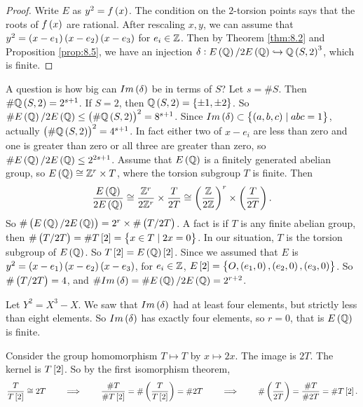 \begin{proof}
Write $ E $ as $ y^2 = f\br{x} $. The condition on the $ 2 $-torsion points says that the roots of $ f\br{x} $ are rational. After rescaling $ x, y $, we can assume that $ y^2 = \br{x - e_1}\br{x - e_2}\br{x - e_3} $ for $ e_i \in \mathbb{Z} $. Then by Theorem \ref{thm:8.2} and Proposition \ref{prop:8.5}, we have an injection $ \delta : E\br{\Q} / 2E\br{\Q} \hookrightarrow \Q\br{S, 2}^3 $, which is finite.
\end{proof}

A question is how big can $ Im\br{\delta} $ be in terms of $ S $? Let $ s = \#S $. Then $ \#\Q\br{S, 2} = 2^{s + 1} $. If $ S = 2 $, then $ \Q\br{S, 2} = \cbr{\pm 1, \pm 2} $. So $ \#E\br{\Q} / 2E\br{\Q} \le \br{\#\Q\br{S, 2}}^2 = 8^{s + 1} $. Since $ Im\br{\delta} \subset \cbr{\br{a, b, c} \mid abc = 1} $, actually $ \br{\#\Q\br{S, 2}}^2 = 4^{s + 1} $. In fact either two of $ x - e_i $ are less than zero and one is greater than zero or all three are greater than zero, so $ \#E\br{\Q} / 2E\br{\Q} \le 2^{2s + 1} $. Assume that $ E\br{\Q} $ is a finitely generated abelian group, so $ E\br{\Q} \cong \Z^r \times T $, where the torsion subgroup $ T $ is finite. Then
$$ \dfrac{E\br{\Q}}{2E\br{\Q}} \cong \dfrac{\Z^r}{2\Z^r} \times \dfrac{T}{2T} \cong \br{\dfrac{\Z}{2\Z}}^r \times \br{\dfrac{T}{2T}}. $$
So $ \#\br{E\br{\Q} / 2E\br{\Q}} = 2^r \times \#\br{T / 2T} $. A fact is if $ T $ is any finite abelian group, then $ \#\br{T / 2T} = \#T\sbr{2} = \cbr{x \in T \mid 2x = 0} $. In our situation, $ T $ is the torsion subgroup of $ E\br{\Q} $. So $ T\sbr{2} = E\br{\Q}\sbr{2} $. Since we assumed that $ E $ is $ y^2 = \br{x - e_1}\br{x - e_2}\br{x - e_3} $, for $ e_i \in \mathbb{Z} $, $ E\sbr{2} = \cbr{O, \br{e_1, 0}, \br{e_2, 0}, \br{e_3, 0}} $. So $ \#\br{T / 2T} = 4 $, and $ \#Im\br{\delta} = \#E\br{\Q} / 2E\br{\Q} = 2^{r + 2} $.

\begin{example*}
Let $ Y^2 = X^3 - X $. We saw that $ Im\br{\delta} $ had at least four elements, but strictly less than eight elements. So $ Im\br{\delta} $ has exactly four elements, so $ r = 0 $, that is $ E\br{\Q} $ is finite.
\end{example*}

Consider the group homomorphism $ T \mapsto T $ by $ x \mapsto 2x $. The image is $ 2T $. The kernel is $ T\sbr{2} $. So by the first isomorphism theorem,
$$ \dfrac{T}{T\sbr{2}} \cong 2T \qquad \implies \qquad \dfrac{\#T}{\#T\sbr{2}} = \#\br{\dfrac{T}{T\sbr{2}}} = \#2T \qquad \implies \qquad \#\br{\dfrac{T}{2T}} = \dfrac{\#T}{\#2T} = \#T\sbr{2}. $$

